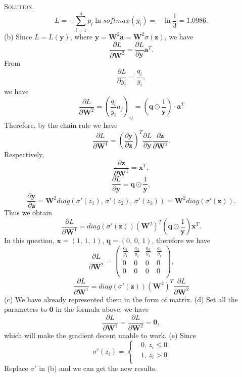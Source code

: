 \documentclass[12pt, a4paper, oneside]{ctexart}
\newenvironment{solution}{\par\noindent\textsc{Solution. }}{\\\par}
\begin{document}
\begin{solution}
	\[
	L = - \sum_{i=1}^{4} p_i \ln softmax(y_i) = -\ln\frac{1}{3} = 1.0986.
	\]
	\newline 
	(b) Since $L = L(\mathbf{y})$, where $\mathbf{y} = \mathbf{W}^2\mathbf{a} = \mathbf{W}^2\sigma(\mathbf{z})$, we have
	\[
	\frac{\partial L}{\partial\mathbf{W}^2} = \frac{\partial L}{\partial\mathbf{y}} \mathbf{a}^T.
	\]
	From
	\[
	 \frac{\partial L}{\partial y_i} = \frac{q_i}{y_i},
	\]
	we have
	\[
	\frac{\partial L}{\partial\mathbf{W}^2} = (\frac{q_i}{y_i}a_j)_{ij} = (\mathbf{q}\odot\frac{1}{\mathbf{y}})\cdot\mathbf{a}^T
	\]
	Therefore, by the chain rule we have
	\[
	\frac{\partial L}{\partial\mathbf{W}^1} = (\frac{\partial\mathbf{y}}{\partial\mathbf{z}})^T\frac{\partial L}{\partial\mathbf{y}}\frac{\partial\mathbf{z}}{\partial\mathbf{W}^1}.
	\]
	Respectively,
	\[
	\frac{\partial\mathbf{z}}{\partial\mathbf{W}^1} = \mathbf{x}^T,
	\]
	\[
	\frac{\partial L}{\partial\mathbf{y}} = \mathbf{q}\odot\frac{1}{\mathbf{y}},
	\]
	\[
	\frac{\partial\mathbf{y}}{\partial\mathbf{z}} = \mathbf{W}^2diag(\sigma'(z_1),\, \sigma'(z_2),\, \sigma'(z_3)) = \mathbf{W}^2diag(\sigma'(\mathbf{z})).
	\]
	Thus we obtain
	\[
	\frac{\partial L}{\partial\mathbf{W}^1} = diag(\sigma'(\mathbf{z}))(\mathbf{W}^2)^T(\mathbf{q}\odot\frac{1}{\mathbf{y}})\mathbf{x}^T.
	\]
	In this question, $\mathbf{x} = (1,\, 1,\, 1)$, $\mathbf{q} = (0,\, 0,\, 1)$, therefore we have
	\[
	\frac{\partial L}{\partial\mathbf{W}^2} =
	\begin{pmatrix}
	\frac{a_1}{y_1} & \frac{a_2}{y_1} & \frac{a_3}{y_1} &\frac{a_4}{y_1} \\
	0 & 0 & 0 & 0 \\
	0 & 0 & 0 & 0 \\
	\end{pmatrix},
	\]
	\[
	\frac{\partial L}{\partial\mathbf{W}^1} = diag(\sigma'(\mathbf{z}))(\mathbf{W}^2)^T\frac{\partial L}{\partial\mathbf{W}^2}
	\]
	(c) We have already represented them in the form of matrix.
	\newline\newline
	(d) Set all the parameters to $\mathbf{0}$ in the formula above, we have
	\[
	\frac{\partial L}{\partial\mathbf{W}^1} = \frac{\partial L}{\partial\mathbf{W}^2} = \mathbf{0},
	\]
	which will make the gradient decent unable to work.
	\newline\newline
	(e) Since
	\[
	\sigma'(z_i) =
	\left\lbrace
    \begin{aligned}
     	& 0,\, z_i \leq 0 \\
     	& 1,\, z_i > 0 \\
    \end{aligned}
    \right.
	\]
	Replace $\sigma'$ in (b) and we can get the new results.
\end{solution}
\end{document}
